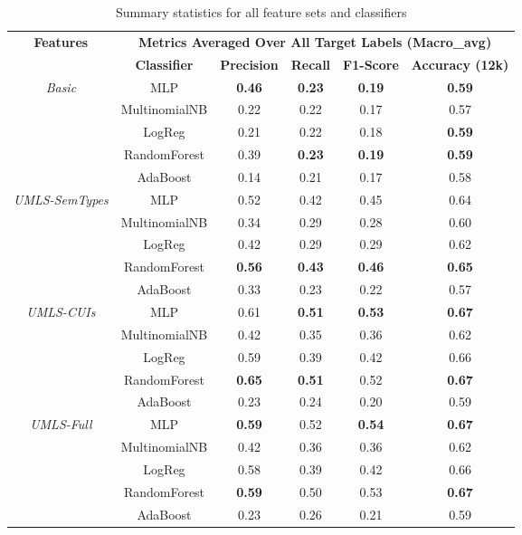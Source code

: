 \begin{table}
	\centering
	\begin{tabular}{|c|c|c|c|c|c|}

\hline
\multirow{2}{*}{\textbf{Features} }	& \multicolumn{5}{c|}{\textbf{Metrics Averaged Over All Target Labels (Macro\_avg)}} \\
\cline{2-6}
 &		\textbf{Classifier} & \textbf{Precision} &  \textbf{Recall} & \textbf{F1-Score} & \textbf{Accuracy (12k)}\\
		\hline 
		\hline 
		
\multirow{5}{*}{ \textit{Basic} } & MLP & \textbf{0.46} & \textbf{0.23} & \textbf{0.19} & \textbf{0.59} \\ 
	\cline{2-6}
		& MultinomialNB & 0.22 & 0.22 & 0.17 & 0.57 \\ 
	\cline{2-6}
		& LogReg & 0.21 & 0.22 & 0.18 & \textbf{0.59} \\
	\cline{2-6}
		& RandomForest & 0.39 & \textbf{0.23} & \textbf{0.19} & \textbf{0.59} \\ 
	\cline{2-6}
		& AdaBoost & 0.14 & 0.21 & 0.17 & 0.58 \\

		
		\hline
		\hline

\multirow{5}{*}{ \textit{UMLS-SemTypes}  } & MLP & 0.52 & 0.42 & 0.45 & 0.64 \\
	\cline{2-6}
	& MultinomialNB & 0.34 & 0.29 & 0.28 & 0.60 \\
	\cline{2-6}
	& LogReg & 0.42 & 0.29 & 0.29 & 0.62 \\
	\cline{2-6}
	& RandomForest & \textbf{0.56} & \textbf{0.43} & \textbf{0.46} & \textbf{0.65} \\
	\cline{2-6}
	& AdaBoost & 0.33 & 0.23 & 0.22 & 0.57 \\
	
	\hline
	\hline

\multirow{5}{*}{ \textit{UMLS-CUIs}  } & MLP & 0.61 & \textbf{0.51} & \textbf{0.53} & \textbf{0.67} \\  
\cline{2-6}
& MultinomialNB & 0.42 & 0.35 & 0.36 & 0.62 \\
\cline{2-6}
& LogReg & 0.59 & 0.39 & 0.42 & 0.66 \\
\cline{2-6}
& RandomForest & \textbf{0.65} & \textbf{0.51} & 0.52 & \textbf{0.67} \\
\cline{2-6}
& AdaBoost & 0.23 & 0.24 & 0.20 & 0.59 \\

		
\hline
\hline

\multirow{5}{*}{ \textit{UMLS-Full}  } & MLP & \textbf{0.59} & 0.52 & \textbf{0.54} & \textbf{0.67} \\
\cline{2-6}
& MultinomialNB & 0.42 & 0.36 & 0.36 & 0.62 \\
\cline{2-6}
& LogReg & 0.58 & 0.39 & 0.42 & 0.66 \\
\cline{2-6}
& RandomForest & \textbf{0.59} & 0.50 & 0.53 & \textbf{0.67} \\
\cline{2-6}
& AdaBoost & 0.23 & 0.26 & 0.21 & 0.59 \\
\hline

\hline

		
	\end{tabular} 
	\caption{\label{tab:Sum-all} Summary statistics for all feature sets and classifiers  }
\end{table}